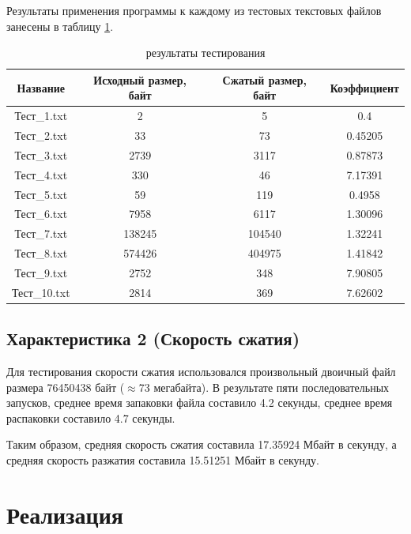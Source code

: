 \documentclass[a4paper,oneside]{article}
\theoremstyle{definition}
\begin{document}
Результаты применения программы к каждому из тестовых текстовых файлов занесены
в таблицу \ref{tbl:results}.

\begin{table}[H]
  \small
  \centering
  \begin{tabular}{|c|c|c|c|}
    \hline
    Название     & Исходный размер, байт & Сжатый размер, байт & Коэффициент \\ \hline \hline
    Тест\_1.txt  & 2           &      5  & 0.4     \\ \hline
    Тест\_2.txt  & 33          &     73  & 0.45205 \\ \hline
    Тест\_3.txt  & 2739        &   3117  & 0.87873 \\ \hline
    Тест\_4.txt  & 330         &     46  & 7.17391 \\ \hline
    Тест\_5.txt  & 59          &    119  & 0.4958  \\ \hline
    Тест\_6.txt  & 7958        &   6117  & 1.30096 \\ \hline
    Тест\_7.txt  & 138245      & 104540  & 1.32241 \\ \hline
    Тест\_8.txt  & 574426      & 404975  & 1.41842 \\ \hline
    Тест\_9.txt  & 2752        &    348  & 7.90805 \\ \hline
    Тест\_10.txt & 2814        &    369  & 7.62602 \\ \hline
  \end{tabular}
  \caption{результаты тестирования}
  \label{tbl:results}
\end{table}

\subsection{Характеристика 2 (Скорость сжатия)}

Для тестирования скорости сжатия использовался произвольный двоичный
файл размера 76450438 байт ($\approx$73 мегабайта). В результате пяти
последовательных запусков, среднее время запаковки файла составило 4.2
секунды, среднее время распаковки составило 4.7 секунды.

Таким образом, средняя скорость сжатия составила 17.35924 Мбайт в секунду, а
средняя скорость разжатия составила 15.51251 Мбайт в секунду.

\section{Реализация}
\end{document}
